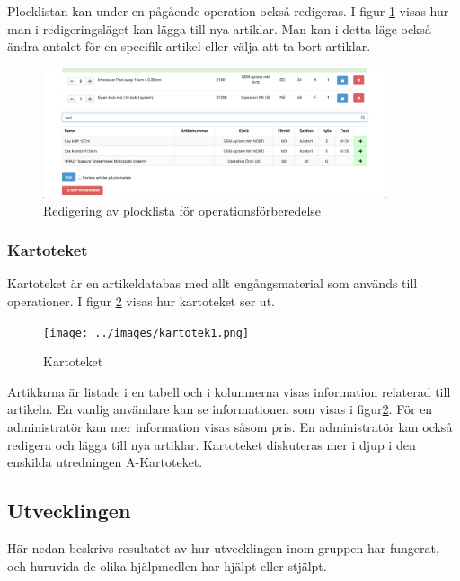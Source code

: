 Plocklistan kan under en pågående operation också redigeras. I figur \ref{fig:plocklistaredigering} visas hur man i redigeringsläget kan lägga till nya artiklar. Man kan i detta läge också ändra antalet för en specifik artikel eller välja att ta bort artiklar.

\begin{figure}[h!]
  \centering
  \includegraphics[width=0.9\textwidth]{images/site/plocklistaredigering}
  \caption{Redigering av plocklista för operationsförberedelse}
  \label{fig:plocklistaredigering}
\end{figure}

\subsubsection{Kartoteket}
Kartoteket är en artikeldatabas med allt engångsmaterial som används till operationer. I figur \ref{fig:kartoteket} visas hur kartoteket ser ut. 
\begin{figure}[h!]
  \centering
  \texttt{[image: ../images/kartotek1.png]}
  \caption{Kartoteket}
  \label{fig:kartoteket}
\end{figure}
Artiklarna är listade i en tabell och i kolumnerna visas information relaterad till artikeln. En vanlig användare kan se informationen som visas i figur\ref{fig:kartoteket}. För en administratör kan mer information visas såsom pris. En administratör kan också redigera och lägga till nya artiklar. Kartoteket diskuteras mer i djup i den enskilda utredningen A-Kartoteket.%


\subsection{Utvecklingen}
Här nedan beskrivs resultatet av hur utvecklingen inom gruppen har fungerat,
och huruvida de olika hjälpmedlen har hjälpt eller stjälpt.

